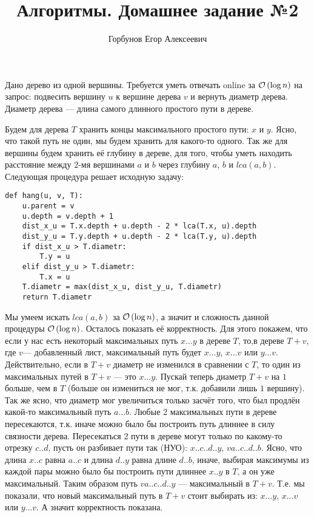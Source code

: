
\title{Алгоритмы. Домашнее задание №2}
\author{Горбунов Егор Алексеевич}


\maketitle

\begin{task}[1]
	Дано дерево из одной вершины. Требуется уметь отвечать online за $\mathcal{O}\left(\log{n}\right)$ на запрос: подвесить вершину $u$ к вершине дерева $v$ и вернуть диаметр дерева. Диаметр дерева --- длина самого длинного простого пути в дереве.
\end{task}
\begin{solution}
Будем для дерева $T$ хранить концы максимального простого пути: $x$ и $y$. Ясно, что такой путь не один, мы будем хранить для какого-то одного. Так же для вершины будем хранить её глубину в дереве, для того, чтобы уметь находить расстояние между $2$-мя вершинами $a$ и $b$ через глубину $a$, $b$ и $lca(a, b)$. Следующая процедура решает исходную задачу:
\begin{lstlisting}[]
def hang(u, v, T):
	u.parent = v
	u.depth = v.depth + 1
	dist_x_u = T.x.depth + u.depth - 2 * lca(T.x, u).depth
	dist_y_u = T.y.depth + u.depth - 2 * lca(T.y, u).depth
	if dist_x_u > T.diametr:
		T.y = u
	elif dist_y_u > T.diametr:
		T.x = u
	T.diametr = max(dist_x_u, dist_y_u, T.diametr)
	return T.diametr
\end{lstlisting}
Мы умеем искать $lca(a,b)$ за $\mathcal{O}\left(\log{n}\right)$, а значит и сложность данной процедуры $\mathcal{O}\left(\log{n}\right)$. Осталось показать её корректность. Для этого покажем, что если у нас есть некоторый максимальных путь $x...y$ в дереве $T$, то,в дереве $T+v$, где $v$--- добавленный лист, максимальный путь будет $x...y$, $x...v$ или $y...v$. Действительно, если в $T+v$ диаметр не изменился в сравнении с $T$, то один из максимальных путей в $T+v$ --- это $x...y$. Пускай теперь диаметр $T+v$ на $1$ больше, чем в $T$ (больше он измениться не мог, т.к. добавили лишь $1$ вершину). Так же ясно, что диаметр мог увеличиться только засчёт того, что был продлён какой-то максимальный путь $a...b$. Любые $2$ максимальных пути в дереве пересекаются, т.к. иначе можно было бы построить путь длиннее в силу связности дерева. Пересекаться $2$ пути в дереве могут только по какому-то отрезку $c..d$, пусть он разбивает пути так (НУО): $x..c..d..y$, $va..c..d..b$.
Ясно, что длина $x..c$ равна $a..c$ и длина $d..y$ равна длине $d..b$, иначе, выбирая максимумы из каждой пары можно было бы построить пути длиннее $x..y$ в $T$, а он уже максимальный. Таким образом путь $va..c..d..y$ --- максимальный в $T+v$. Т.е. мы показали, что новый максимальный путь в $T+v$ стоит выбирать из: $x...y$, $x...v$ или $y...v$. А значит корректность показана. \xqed
\end{solution}


